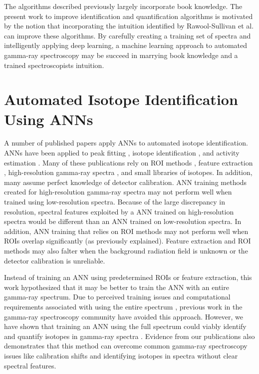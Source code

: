 The algorithms described previously largely incorporate book knowledge. The present work to improve identification and quantification algorithms is motivated by the notion that incorporating the intuition identified by Rawool-Sullivan et al. can improve these algorithms. By carefully creating a training set of spectra and intelligently applying deep learning, a machine learning approach to automated gamma-ray spectroscopy may be succeed in marrying book knowledge and a trained spectroscopists intuition.


\section{Automated Isotope Identification Using ANNs}

A number of published papers apply ANNs to automated isotope identification. ANNs have been applied to peak fitting \cite{Abdel-Aal2002}, isotope identification \cite{Abdel-Aal1996, Medhat2012}, and activity estimation \cite{Abdel-Aal1996, Vigneron1996}. Many of these publications rely on ROI methods \cite{Pilato1999}, feature extraction \cite{Chen2009}, high-resolution gamma-ray spectra \cite{Yoshida2002}, and small libraries of isotopes. In addition, many assume perfect knowledge of detector calibration. ANN training methods created for high-resolution gamma-ray spectra may not perform well when trained using low-resolution spectra. Because of the large discrepancy in resolution, spectral features exploited by a ANN trained on high-resolution spectra would be different than an ANN trained on low-resolution spectra. In addition, ANN training that relies on ROI methods may not perform well when ROIs overlap significantly (as previously explained). Feature extraction and ROI methods may also falter when the background radiation field is unknown or the detector calibration is unreliable.  

Instead of training an ANN using predetermined ROIs or feature extraction, this work hypothesized that it may be better to train the ANN with an entire gamma-ray spectrum. Due to perceived training issues and computational requirements associated with using the entire spectrum \cite{Pilato1999,Yoshida2002}, previous work in the gamma-ray spectroscopy community have avoided this approach. However, we have shown that training an ANN using the full spectrum could viably identify and quantify isotopes in gamma-ray spectra \cite{kamuda2017,kamudaThesis2017,kamuda2018}. Evidence from our publications also demonstrates that this method can overcome common gamma-ray spectroscopy issues like calibration shifts and identifying isotopes in spectra without clear spectral features.

